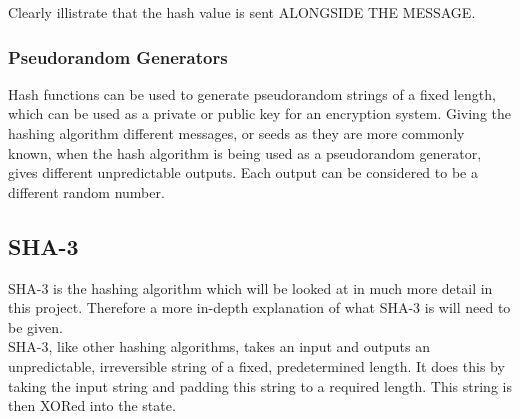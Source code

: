 Clearly illistrate that the hash value is sent ALONGSIDE THE MESSAGE.

\subsubsection{Pseudorandom Generators}
Hash functions can be used to generate pseudorandom strings of a fixed length, which can be used as a private or public key for an encryption system. Giving the hashing algorithm different messages, or seeds as they are more commonly known, when the hash algorithm is being used as a pseudorandom generator, gives different unpredictable outputs. Each output can be considered to be a different random number.
\subsection{SHA-3}
SHA-3 is the hashing algorithm which will be looked at in much more detail in this project. Therefore a more in-depth explanation of what SHA-3 is will need to be given.
\vspace{5 mm}\\
SHA-3, like other hashing algorithms, takes an input and outputs an unpredictable, irreversible string of a fixed, predetermined length. It does this by taking the input string and padding this string to a required length. This string is then XORed into the state.

